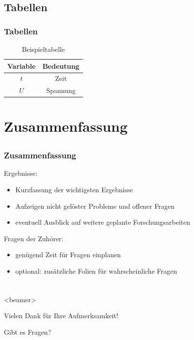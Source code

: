 \documentclass[aspectratio=43]{beamer} 	%
\begin{document}
\subsection{Tabellen}

\begin{frame}
	\frametitle<presentation>{Tabellen}
	\begin{table}
		\caption{Beispieltabelle}
		\label{tab:beispiel}
		\centering
			\begin{tabular}{cc}
				\toprule
				Variable & Bedeutung \\
				\midrule
				$t$ & Zeit \\
				$U$ & Spannung \\
				\bottomrule
			\end{tabular}
	\end{table}
\end{frame}

\section{Zusammenfassung}

\subsection*{}

\begin{frame}
	\frametitle<presentation>{Zusammenfassung}
	\begin{block}{Ergebnisse:}
	  \begin{itemize}
	  	\item Kurzfassung der wichtigsten Ergebnisse
	  	\item Aufzeigen nicht gelöster Probleme und offener Fragen
	  	\item eventuell Ausblick auf weitere geplante Forschungsarbeiten
		\end{itemize}
	\end{block}
	\begin{block}{Fragen der Zuhörer:}
	 \begin{itemize}
	 	\item genügend Zeit für Fragen einplanen
	 	\item optional: zusätzliche Folien für wahrscheinliche Fragen
	 \end{itemize}
	\end{block}	
\end{frame}

\section*{}

\begin{frame}<beamer>{}
	\begin{center}
		Vielen Dank für Ihre Aufmerksamkeit!
	\end{center}
	\begin{center}
		Gibt es Fragen?
	\end{center}
\end{frame}
\end{document}
